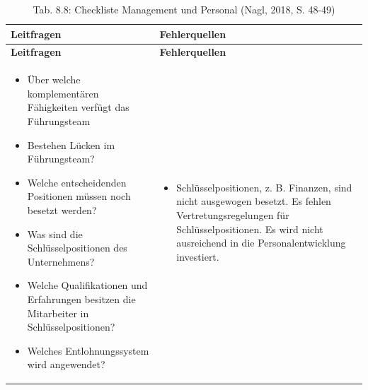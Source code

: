 \documentclass[
  letterpaper,
]{book}
\providecommand{\tightlist}{%
  \setlength{\itemsep}{0pt}\setlength{\parskip}{0pt}}
\begin{document}
\begin{longtable}[]{@{}
  >{\raggedright\arraybackslash}p{}
  >{\raggedright\arraybackslash}p{}@{}}
\caption{Tab. 8.8: Checkliste Management und Personal (Nagl, 2018, S.
48-49)}\tabularnewline
\toprule\noalign{}
\begin{minipage}[b]{\linewidth}\raggedright
\textbf{Leitfragen}
\end{minipage} & \begin{minipage}[b]{\linewidth}\raggedright
\textbf{Fehlerquellen}
\end{minipage} \\
\midrule\noalign{}
\endfirsthead
\toprule\noalign{}
\begin{minipage}[b]{\linewidth}\raggedright
\textbf{Leitfragen}
\end{minipage} & \begin{minipage}[b]{\linewidth}\raggedright
\textbf{Fehlerquellen}
\end{minipage} \\
\midrule\noalign{}
\endhead
\bottomrule\noalign{}
\endlastfoot
\begin{minipage}[t]{\linewidth}\raggedright
\begin{itemize}
\item
  Über welche komplementären Fähigkeiten verfügt das Führungsteam
\item
  Bestehen Lücken im Führungsteam?
\item
  Welche entscheidenden Positionen müssen noch besetzt werden?
\item
  Was sind die Schlüsselpositionen des Unternehmens?
\item
  Welche Qualifikationen und Erfahrungen besitzen die Mitarbeiter in
  Schlüsselpositionen?
\item
  Welches Entlohnungssystem wird angewendet?
\end{itemize}
\end{minipage} & \begin{minipage}[t]{\linewidth}\raggedright
\begin{itemize}
\tightlist
\item
  Schlüsselpositionen, z. B. Finanzen, sind nicht ausgewogen besetzt. Es
  fehlen Vertretungsregelungen für Schlüsselpositionen. Es wird nicht
  ausreichend in die Personalentwicklung investiert.
\end{itemize}
\end{minipage} \\
\end{longtable}
\end{document}
